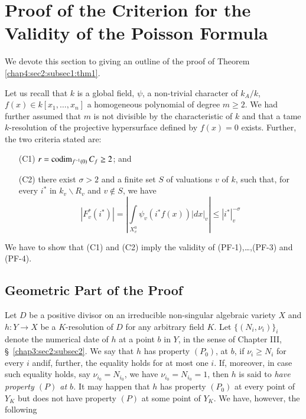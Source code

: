 \section[Proof of the Criterion for the Validity...]{Proof of the Criterion for the Validity of the Poisson
  Formula}\label{chap4:sec6}%

We devote this section to giving an outline of the proof of Theorem
\ref{chap4:sec2:subsec1:thm1}. 

Let us recall that $k$ is a global field, $\psi$, a non-trivial
character of $k_{A}/k$, $f(x)\in k[x_{1},\ldots,x_{n}]$ a homogeneous
polynomial of degree $m\geq 2$. We had further assumed that $m$ is not
divisible by the characteristic of $k$ and that a tame $k$-resolution
of the projective hypersurface defined by $f(x)=0$ exists. Further,
the two criteria stated are:
\begin{itemize}
\item[(C1)] $r=\operatorname{codim}_{f^{-1}(0)}C_{f}\geq 2$; and

\item[(C2)] there exist $\sigma>2$ and a finite set $S$ of valuations
  $v$ of $k$, such that, for every $i^{\ast}$ in $k_{v}\backslash
  R_{v}$ and $v\not\in S$, we have
$$
|F^{\ast}_{v}(i^{\ast})|=\left|\int\limits_{X^{0}_{v}}\psi_{v}(i^{\ast}f(x))|dx|_{v}\right|\leq
|i^{\ast}|^{-\sigma}_{v} 
$$
\end{itemize}
We have to show that (C1) and (C2) imply the validity of
(PF-1),\ldots,(PF-3) and (PF-4).

\subsection{Geometric Part of the Proof}\label{chap4:sec6:subsec1} %

Let $D$ be a positive divisor on an irreducible non-singular algebraic
variety $X$ and $h:Y\to X$ be a $K$-resolution of $D$ for any
arbitrary field $K$. Let $\{(N_{i},\nu_{i})\}_{i}$ denote the
numerical date of $h$ at a point $b$ in $Y$, in the sense of Chapter
III, \S\ \ref{chap3:sec2:subsec2}. We say that $h$ has property $(P_{0})$, at $b$, if
$\nu_{i}\geq N_{i}$ for every $i$ and\pageoriginale if, further, the
equality holds for at most one $i$. If, moreover, in case such
equality holds, say $\nu_{i_{0}}=N_{i_{0}}$, we have
$\nu_{i_{0}}=N_{i_{0}}=1$, then $h$ is said to {\em have property
  $(P)$ at $b$.} It may happen that $h$ has property $(P_{0})$ at
every point of $Y_{K}$ but does not have property $(P)$ at some point
of $Y_{K}$. We have, however, the following

